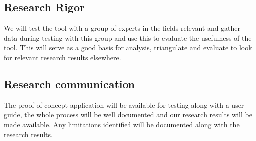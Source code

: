 \subsection{Research Rigor}
We will test the tool with a group of experts in the fields relevant and gather data during testing with this group and use this to evaluate the usefulness of
the tool. This will serve as a good basis for analysis, triangulate and evaluate to look for relevant research results elsewhere.

\subsection{Research communication}
The proof of concept application will be available for testing along with a user guide, the whole process will be well documented and our research results will be made available.
Any limitations identified  will be documented along with the research results. 



